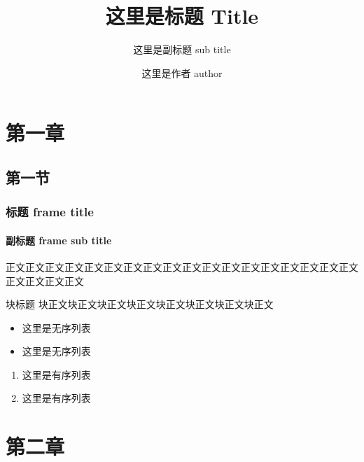 \documentclass[12pt]{beamer}
\title{这里是标题 Title}
\subtitle{这里是副标题 sub title}
\author{这里是作者 author}
\institute{这里是学院 institute}
\begin{document}
\maketitle


\section{第一章}
\subsection{第一节}

\begin{frame}[t]
    \frametitle{标题 frame title}
    \framesubtitle{副标题 frame sub title}

    正文正文正文正文正文正文正文正文正文正文正文正文正文正文正文正文正文正文正文正文正文正文

    \begin{block}{块标题}
        块正文块正文块正文块正文块正文块正文块正文块正文
    \end{block}

    \begin{itemize}
        \item 这里是无序列表
        \item 这里是无序列表
    \end{itemize}

    \begin{enumerate}
        \item 这里是有序列表
        \item 这里是有序列表
    \end{enumerate}

\end{frame}

\section{第二章}
\end{document}
